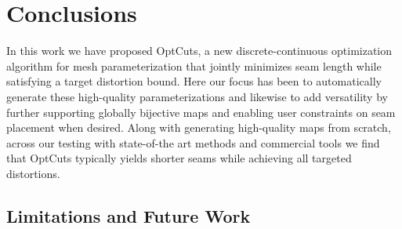 
\section{Conclusions}
\label{sec:conclusion}

In this work we have proposed OptCuts, a new discrete-continuous optimization algorithm for mesh parameterization that jointly minimizes seam length while satisfying a target distortion bound. Here our focus has been to automatically generate these high-quality parameterizations and likewise to add versatility by further supporting globally bijective maps and enabling user constraints on seam placement when desired. Along with generating high-quality maps from scratch, across our testing with state-of-the art methods and commercial tools we find that OptCuts typically yields shorter seams while achieving all targeted distortions.

\vspace{-0.1cm}
\subsection{Limitations and Future Work}

